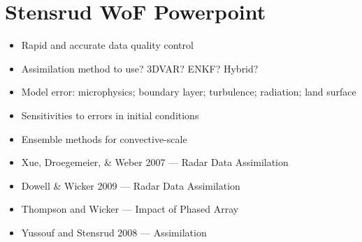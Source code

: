 \documentclass{article}
\begin{document}
\newpage
\section{Stensrud WoF Powerpoint}
    \begin{itemize}
        \item Rapid and accurate data quality control
        \item Assimilation method to use? 3DVAR? ENKF? Hybrid?
        \item Model error: microphysics; boundary layer; turbulence; radiation; land surface
        \item Sensitivities to errors in initial conditions
        \item Ensemble methods for convective-scale
    \end{itemize}

    \begin{itemize}
        \item Xue, Droegemeier, \& Weber 2007 --- Radar Data Assimilation
        \item Dowell \& Wicker 2009 --- Radar Data Assimilation
        \item Thompson and Wicker --- Impact of Phased Array
        \item Yussouf and Stensrud 2008 --- Assimilation
    \end{itemize}
\end{document}
